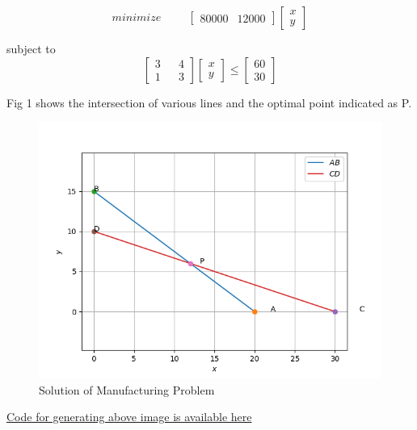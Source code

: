\documentclass[journal,12pt,onecolumn]{IEEEtran}
\begin{document}
\begin{enumerate}
\begin{equation}
minimize\hspace{1cm}
\begin{bmatrix}
80000&12000
\end{bmatrix}
\begin{bmatrix}
x\\y
\end{bmatrix}
\end{equation}

subject to
\begin{equation}
\begin{bmatrix}
3&&4\\1&&3
\end{bmatrix}
\begin{bmatrix}
x\\y
\end{bmatrix}
\leq
\begin{bmatrix}
60\\30
\end{bmatrix}
\end{equation}


Fig 1 shows the intersection of various lines and the optimal point indicated as P.
\begin{figure}[h]
\includegraphics[width=0.9\columnwidth]{Manufacturing.png}
\caption{Solution of Manufacturing Problem}
\end{figure}


\href{https://github.com/vivek13s08/Optimization/blob/master/Manufacturing.py}{Code for generating above image is available here}

\end{enumerate}
\end{document}
